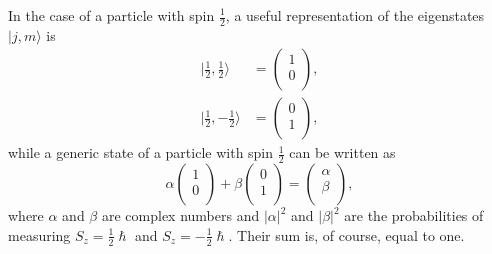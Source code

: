 In the case of a particle with spin $\frac{1}{2}$, a useful representation of the eigenstates \(\mid j, m\rangle \) is
\begin{align*}
\mid\frac{1}{2}   , \frac{1}{2}\rangle&=
\begin{pmatrix} 1\\ 0\\ 
\end{pmatrix}, \\
\mid \frac{1}{2} ,-\frac{1}{2}\rangle&=
\begin{pmatrix} 0\\ 1\\ 
\end{pmatrix},
\end{align*}
while a generic state of a particle with spin $\frac{1}{2}$ can be written as
\[
\alpha \begin{pmatrix} 1\\ 0\\ 
\end{pmatrix}+\beta \begin{pmatrix} 0\\ 1\\ 
\end{pmatrix}=\begin{pmatrix} \alpha\\ \beta\\ 
\end{pmatrix},
\]
where $\alpha$ and $\beta$ are complex numbers and $|\alpha|^2$ and $|\beta|^2$ are the probabilities of measuring $S_{z}=\frac{1}{2}\hslash$ and $S_{z}=-\frac{1}{2}\hslash$. Their sum is, of course, equal to one.

